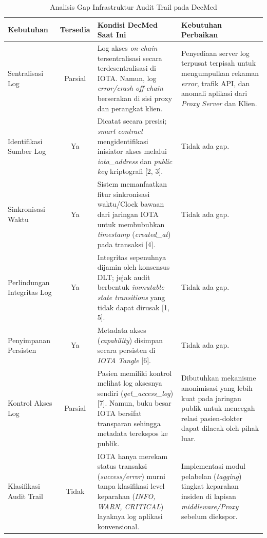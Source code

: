 \begin{table}[htbp]
\centering
\caption{Analisis Gap Infrastruktur Audit Trail pada DecMed}
\label{tab:gap-infrastruktur-audit}
    \begin{tabular}{|p{3cm}|c|p{3.5cm}|p{3.5cm}|}
    \hline
    \textbf{Kebutuhan} &
    \textbf{Tersedia} &
    \textbf{Kondisi DecMed Saat Ini} &
    \textbf{Kebutuhan Perbaikan} \\
    \hline

    Sentralisasi Log &
    Parsial &
    Log akses \textit{on-chain} tersentralisasi secara terdesentralisasi di IOTA. Namun, log \textit{error/crash off-chain} berserakan di sisi proxy dan perangkat klien. &
    Penyediaan server log terpusat terpisah untuk mengumpulkan rekaman \textit{error}, trafik API, dan anomali aplikasi dari \textit{Proxy Server} dan Klien. \\
    \hline

    Identifikasi Sumber Log &
    Ya &
    Dicatat secara presisi; \textit{smart contract} mengidentifikasi inisiator akses melalui \textit{iota\_address} dan \textit{public key} kriptografi [2, 3]. &
    Tidak ada gap. \\
    \hline

    Sinkronisasi Waktu &
    Ya &
    Sistem memanfaatkan fitur sinkronisasi waktu/Clock bawaan dari jaringan IOTA untuk membubuhkan \textit{timestamp} (\textit{created\_at}) pada transaksi [4]. &
    Tidak ada gap. \\
    \hline

    Perlindungan Integritas Log &
    Ya &
    Integritas sepenuhnya dijamin oleh konsensus DLT; jejak audit berbentuk \textit{immutable state transitions} yang tidak dapat dirusak [1, 5]. &
    Tidak ada gap. \\
    \hline

    Penyimpanan Persisten &
    Ya &
    Metadata akses (\textit{capability}) disimpan secara persisten di \textit{IOTA Tangle} [6]. &
    Tidak ada gap. \\
    \hline

    Kontrol Akses Log &
    Parsial &
    Pasien memiliki kontrol melihat log aksesnya sendiri (\textit{get\_access\_log}) [7]. Namun, buku besar IOTA bersifat transparan sehingga metadata terekspos ke publik. &
    Dibutuhkan mekanisme anonimisasi yang lebih kuat pada jaringan publik untuk mencegah relasi pasien-dokter dapat dilacak oleh pihak luar. \\
    \hline

    Klasifikasi Audit Trail &
    Tidak &
    IOTA hanya merekam status transaksi (\textit{success/error}) murni tanpa klasifikasi level keparahan (\textit{INFO, WARN, CRITICAL}) layaknya log aplikasi konvensional. &
    Implementasi modul pelabelan (\textit{tagging}) tingkat keparahan insiden di lapisan \textit{middleware/Proxy} sebelum diekspor. \\
    \hline


\end{tabular}
\end{table}
